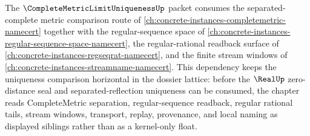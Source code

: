 The $\CompleteMetricLimitUniquenessUp$ packet consumes the separated-complete metric comparison route of \autoref{ch:concrete-instances-completemetric-namecert} together with the regular-sequence space of \autoref{ch:concrete-instances-regular-sequence-space-namecert}, the regular-rational readback surface of \autoref{ch:concrete-instances-regseqrat-namecert}, and the finite stream windows of \autoref{ch:concrete-instances-streamname-namecert}. This dependency keeps the uniqueness comparison horizontal in the dossier lattice: before the $\RealUp$ zero-distance seal and separated-reflection uniqueness can be consumed, the chapter reads CompleteMetric separation, regular-sequence readback, regular rational tails, stream windows, transport, replay, provenance, and local naming as displayed siblings rather than as a kernel-only float.
